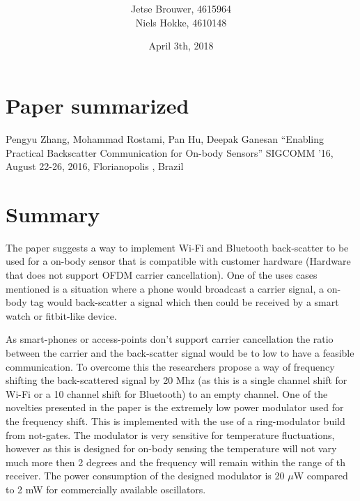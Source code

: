 \documentclass [a4,twoside,11pt] {article}
\begin{document}
\title{
}
\author{Jetse Brouwer, 4615964 \\ Niels Hokke, 4610148}
\date{April 3th, 2018}
\maketitle

\setcounter{secnumdepth}{1}


\section{Paper summarized}
Pengyu Zhang, Mohammad Rostami, Pan Hu, Deepak Ganesan ``Enabling Practical Backscatter Communication for On-body Sensors'' SIGCOMM ’16, August 22-26, 2016, Florianopolis , Brazil


\section{Summary}
The paper suggests a way to implement Wi-Fi and Bluetooth back-scatter to be used for a on-body sensor that is compatible with customer hardware (Hardware that does not support OFDM carrier cancellation). One of the uses cases mentioned is a situation where a phone would broadcast a carrier signal, a on-body tag would back-scatter a signal which then could be received by a smart watch or fitbit-like device.

As smart-phones or access-points don't support carrier cancellation the ratio between the carrier and the back-scatter signal would be to low to have a feasible communication. To overcome this the researchers propose a way of frequency shifting the back-scattered signal by 20 Mhz (as this is a single channel shift for Wi-Fi or a 10 channel shift for Bluetooth) to an empty channel. One of the novelties presented in the paper is the extremely low power modulator used for the frequency shift. This is implemented with the use of a ring-modulator build from not-gates. The modulator is very sensitive for temperature fluctuations, however as this is designed for on-body sensing the temperature will not vary much more then 2 degrees and the frequency will remain within the range of th receiver. The power consumption of the designed modulator is 20 $\mu$W compared to 2 mW for commercially available oscillators. 
\end{document}
